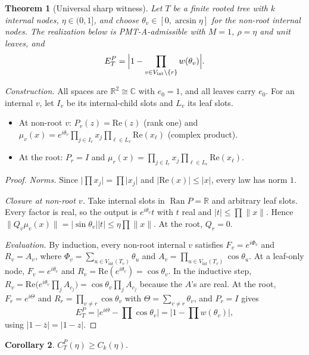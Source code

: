 \documentclass[11pt]{amsart}
\newtheorem{theorem}{Theorem}[section]
\newtheorem{corollary}[theorem]{Corollary}
\theoremstyle{definition}
\newcommand{\R}{\mathbb{R}}
\newcommand{\C}{\mathbb{C}}
\newcommand{\Vint}{V_{\mathrm{int}}}
\newcommand{\Ran}{\operatorname{Ran}}
\newcommand{\norm}[1]{\lVert #1\rVert}
\newcommand{\abs}[1]{\lvert #1\rvert}
\newcommand{\PMTA}{\textsf{PMT-A}}
\begin{document}
\begin{theorem}[Universal sharp witness]\label{thm:witness}
Let $T$ be a finite rooted tree with $k$ internal nodes, $\eta\in(0,1]$, and choose
$\theta_v\in[0,\arcsin\eta]$ for the non-root internal nodes. The realization below
is \PMTA-admissible with $M=1$, $\rho=\eta$ and unit leaves, and
\[
E^P_T=\Bigl|1-\prod_{v\in\Vint\setminus\{r\}}w(\theta_v)\Bigr|.
\]
\end{theorem}

\emph{Construction.} All spaces are $\R^2\cong\C$ with $e_0=1$, and all leaves carry
$e_0$. For an internal $v$, let $I_v$ be its internal-child slots and $L_v$ its leaf
slots.
\begin{itemize}
\item At non-root $v$: $P_v(z)=\mathrm{Re}(z)$ (rank one) and
  $\mu_v(x)=e^{i\theta_v}\prod_{j\in I_v}x_j\prod_{\ell\in L_v}\mathrm{Re}(x_\ell)$
  (complex product).
\item At the root: $P_r=I$ and
  $\mu_r(x)=\prod_{j\in I_r}x_j\prod_{\ell\in L_r}\mathrm{Re}(x_\ell)$.
\end{itemize}

\begin{proof}
\emph{Norms.} Since $\abs{\prod x_j}=\prod\abs{x_j}$ and $\abs{\mathrm{Re}(x)}\le\abs x$,
every law has norm $1$.

\emph{Closure at non-root $v$.} Take internal slots in $\Ran P=\R$ and arbitrary leaf
slots. Every factor is real, so the output is $e^{i\theta_v}t$ with $t$ real and
$\abs t\le\prod\norm x$. Hence
$\norm{Q_v\mu_v(x)}=\abs{\sin\theta_v}\abs t\le\eta\prod\norm x$. At the root, $Q_r=0$.

\emph{Evaluation.} By induction, every non-root internal $v$ satisfies
$F_v=e^{i\Phi_v}$ and $R_v=A_v$, where
$\Phi_v=\sum_{u\in\Vint(T_v)}\theta_u$ and $A_v=\prod_{u\in\Vint(T_v)}\cos\theta_u$.
At a leaf-only node, $F_v=e^{i\theta_v}$ and $R_v=\mathrm{Re}(e^{i\theta_v})=\cos\theta_v$.
In the inductive step,
$R_v=\mathrm{Re}\bigl(e^{i\theta_v}\prod_jA_{c_j}\bigr)=\cos\theta_v\prod_jA_{c_j}$
because the $A$'s are real. At the root, $F_r=e^{i\Theta}$ and $R_r=\prod_{v\ne r}\cos\theta_v$
with $\Theta=\sum_{v\ne r}\theta_v$, and $P_r=I$ gives
\[
E^P_T=\bigl|e^{i\Theta}-\textstyle\prod\cos\theta_v\bigr|=\bigl|1-\prod w(\theta_v)\bigr|,
\]
using $\abs{1-\bar z}=\abs{1-z}$.
\end{proof}

\begin{corollary}\label{cor:lower}
$C^P_T(\eta)\ge C_k(\eta)$.
\end{corollary}
\end{document}
